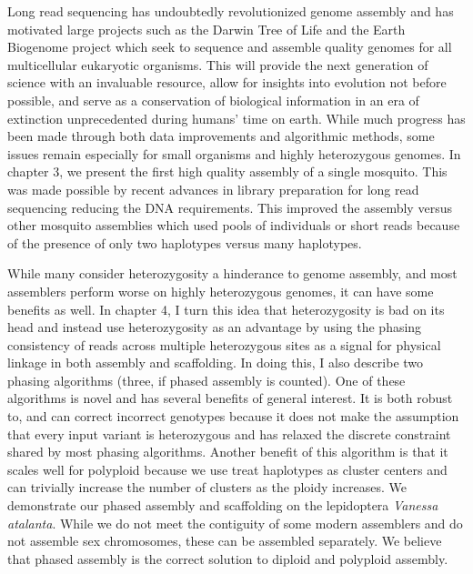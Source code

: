 \par{
Long read sequencing has undoubtedly revolutionized genome assembly and has motivated large projects such as the Darwin Tree of Life and the Earth Biogenome project which seek to sequence and assemble quality genomes for all multicellular eukaryotic organisms. This will provide the next generation of science with an invaluable resource, allow for insights into evolution not before possible, and serve as a conservation of biological information in an era of extinction unprecedented during humans' time on earth. While much progress has been made through both data improvements and algorithmic methods, some issues remain especially for small organisms and highly heterozygous genomes. In chapter 3, we present the first high quality assembly of a single mosquito. This was made possible by recent advances in library preparation for long read sequencing reducing the DNA requirements. This improved the assembly versus other mosquito assemblies which used pools of individuals or short reads because of the presence of only two haplotypes versus many haplotypes.
}

\par{
While many consider heterozygosity a hinderance to genome assembly, and most assemblers perform worse on highly heterozygous genomes, it can have some benefits as well. In chapter 4, I turn this idea that heterozygosity is bad on its head and instead use heterozygosity as an advantage by using the phasing consistency of reads across multiple heterozygous sites as a signal for physical linkage in both assembly and scaffolding. In doing this, I also describe two phasing algorithms (three, if phased assembly is counted). One of these algorithms is novel and has several benefits of general interest. It is both robust to, and can correct incorrect genotypes because it does not make the assumption that every input variant is heterozygous and has relaxed the discrete constraint shared by most phasing algorithms. Another benefit of this algorithm is that it scales well for polyploid because we use treat haplotypes as cluster centers and can trivially increase the number of clusters as the ploidy increases. We demonstrate our phased assembly and scaffolding on the lepidoptera \textit{Vanessa atalanta}. While we do not meet the contiguity of some modern assemblers and do not assemble sex chromosomes, these can be assembled separately. We believe that phased assembly is the correct solution to diploid and polyploid assembly.
}